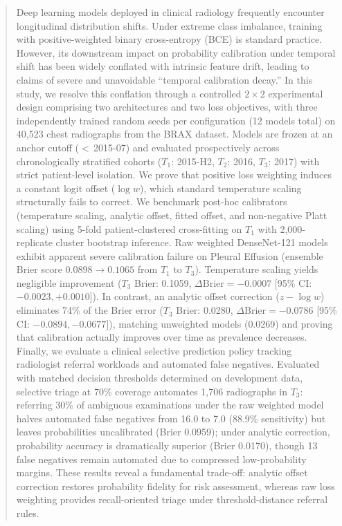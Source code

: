 \documentclass[journal]{IEEEtran}
\begin{document}
\begin{abstract}
Deep learning models deployed in clinical radiology frequently encounter longitudinal distribution shifts. Under extreme class imbalance, training with positive-weighted binary cross-entropy (BCE) is standard practice. However, its downstream impact on probability calibration under temporal shift has been widely conflated with intrinsic feature drift, leading to claims of severe and unavoidable ``temporal calibration decay.'' In this study, we resolve this conflation through a controlled $2 \times 2$ experimental design comprising two architectures and two loss objectives, with three independently trained random seeds per configuration (12 models total) on 40,523 chest radiographs from the BRAX dataset. Models are frozen at an anchor cutoff ($<$\,2015-07) and evaluated prospectively across chronologically stratified cohorts ($T_1$: 2015-H2, $T_2$: 2016, $T_3$: 2017) with strict patient-level isolation. We prove that positive loss weighting induces a constant logit offset ($\log w$), which standard temperature scaling structurally fails to correct. We benchmark post-hoc calibrators (temperature scaling, analytic offset, fitted offset, and non-negative Platt scaling) using 5-fold patient-clustered cross-fitting on $T_1$ with 2,000-replicate cluster bootstrap inference. Raw weighted DenseNet-121 models exhibit apparent severe calibration failure on Pleural Effusion (ensemble Brier score $0.0898 \to 0.1065$ from $T_1$ to $T_3$). Temperature scaling yields negligible improvement ($T_3$ Brier: 0.1059, $\Delta\text{Brier} = -0.0007$ [95\% CI: $-0.0023, +0.0010$]). In contrast, an analytic offset correction ($z - \log w$) eliminates 74\% of the Brier error ($T_3$ Brier: 0.0280, $\Delta\text{Brier} = -0.0786$ [95\% CI: $-0.0894, -0.0677$]), matching unweighted models (0.0269) and proving that calibration actually improves over time as prevalence decreases. Finally, we evaluate a clinical selective prediction policy tracking radiologist referral workloads and automated false negatives. Evaluated with matched decision thresholds determined on development data, selective triage at 70\% coverage automates 1,706 radiographs in $T_3$: referring 30\% of ambiguous examinations under the raw weighted model halves automated false negatives from 16.0 to 7.0 (88.9\% sensitivity) but leaves probabilities uncalibrated (Brier 0.0959); under analytic correction, probability accuracy is dramatically superior (Brier 0.0170), though 13 false negatives remain automated due to compressed low-probability margins. These results reveal a fundamental trade-off: analytic offset correction restores probability fidelity for risk assessment, whereas raw loss weighting provides recall-oriented triage under threshold-distance referral rules.
\end{abstract}
\end{document}
